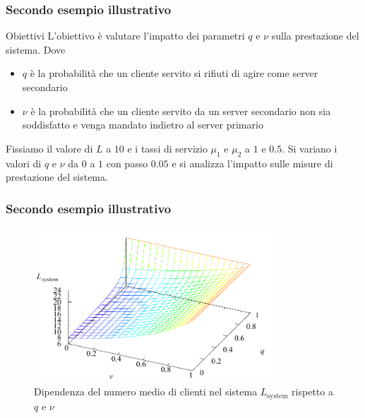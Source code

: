 \documentclass{beamer}
\begin{document}
\begin{frame}
    \frametitle{Secondo esempio illustrativo}
    \begin{block}{Obiettivi}
        L'obiettivo è valutare l'impatto dei parametri $q$ e $\nu$ sulla prestazione del sistema. Dove
        \begin{itemize}
            \item $q$ è la probabilità che un cliente servito si rifiuti di agire come server secondario
            \item $\nu$ è la probabilità che un cliente servito da un server secondario non sia soddisfatto e venga mandato indietro al server primario
        \end{itemize}

    \end{block}
    Fissiamo il valore di $L$ a $10$ e i tassi di servizio $\mu_1$ e $\mu_2$ a $1$ e $0.5$. Si variano i valori di $q$ e $\nu$ da $0$ a $1$ con passo $0.05$ e si analizza l'impatto sulle misure di prestazione del sistema.
\end{frame}




\begin{frame}
    \frametitle{Secondo esempio illustrativo}
    \begin{figure}[h]
        \centering
        \includegraphics[width=0.8\textwidth]{qUQVrEZ.png}
        \caption{Dipendenza del numero medio di clienti nel sistema $L_{\mathrm{system}}$ rispetto a $q$ e $\nu$}
    \end{figure}
\end{frame}
\end{document}
